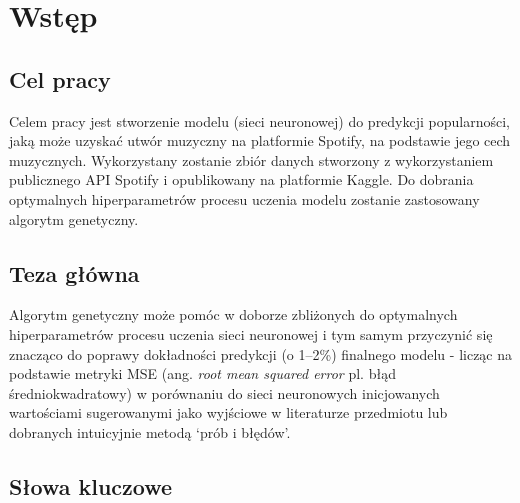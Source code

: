 \documentclass[a4paper,11pt]{article}
\begin{document}
    \newpage

    \maketitle

    \tableofcontents

    \newpage


    \section{Wstęp}

    \subsection{Cel pracy}

    Celem pracy jest stworzenie modelu (sieci neuronowej) do predykcji popularności, jaką może uzyskać utwór muzyczny na platformie Spotify, na podstawie jego cech muzycznych. Wykorzystany zostanie zbiór danych stworzony z wykorzystaniem publicznego API Spotify i opublikowany na platformie Kaggle. Do dobrania optymalnych hiperparametrów procesu uczenia modelu zostanie zastosowany algorytm genetyczny.

    \subsection{Teza główna}

    Algorytm genetyczny może pomóc w doborze zbliżonych do optymalnych hiperparametrów procesu uczenia sieci neuronowej i tym samym przyczynić się znacząco do poprawy dokładności predykcji (o 1--2\%) finalnego modelu - licząc na podstawie metryki MSE (ang. \textit{root mean squared error} pl. błąd średniokwadratowy) w porównaniu do sieci neuronowych inicjowanych wartościami sugerowanymi jako wyjściowe w literaturze przedmiotu lub dobranych intuicyjnie metodą `prób i błędów'.

    \subsection{Słowa kluczowe}
\end{document}
